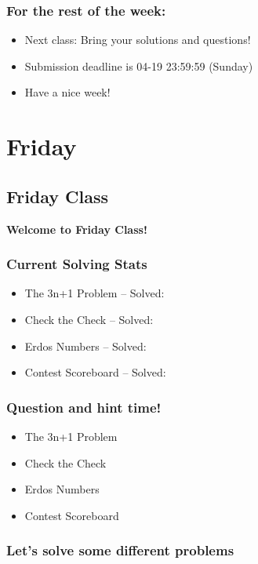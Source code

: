 \documentclass{beamer}
\begin{document}
\begin{frame}
  \frametitle{For the rest of the week:}
  \begin{itemize}
  \item Next class: Bring your solutions and questions!
    \vfill
  \item Submission deadline is 04-19 23:59:59 (Sunday)
    \vfill
  \item Have a nice week!
  \end{itemize}
\end{frame}


\section{Friday}
\subsection{Friday Class}
\begin{frame}
  \begin{center}
  {\bf Welcome to Friday Class!}
  \end{center}
\end{frame}

\begin{frame}
  \frametitle{Current Solving Stats}
  \begin{itemize}
  \item The 3n+1 Problem -- Solved:
  \item Check the Check -- Solved:
  \item Erdos Numbers -- Solved:
  \item Contest Scoreboard -- Solved:
  \end{itemize}
\end{frame}

\begin{frame}
  \frametitle{Question and hint time!}
  \begin{itemize}
  \item<1> The 3n+1 Problem
  \item<2> Check the Check
  \item<3> Erdos Numbers
  \item<4> Contest Scoreboard
  \end{itemize}
\end{frame}

\begin{frame}
  \frametitle{Let's solve some different problems}

\end{frame}
\end{document}
